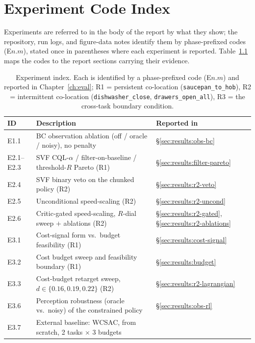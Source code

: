 \documentclass[11pt,a4paper]{report}
\begin{document}
\chapter{Experiment Code Index}
\label{app:exp-index}
\label{sec:setup:exp-index}

Experiments are referred to in the body of the report by what they
show; the repository, run logs, and figure-data notes identify them
by phase-prefixed codes (E$n.m$), stated once in parentheses where
each experiment is reported. Table~\ref{tab:experiment-index} maps
the codes to the report sections carrying their evidence.

\begin{table}[htbp]
\centering
\caption{Experiment index. Each is identified by a phase-prefixed
code (E$n.m$) and reported in Chapter~\ref{ch:eval}; R1 = persistent
co-location (\texttt{saucepan\_to\_hob}), R2 = intermittent
co-location (\texttt{dishwasher\_close}, \texttt{drawers\_open\_all}),
R3 = the cross-task boundary condition.}
\label{tab:experiment-index}
\small
\begin{tabular}{lll}
\toprule
ID & Description & Reported in \\
\midrule
E1.1   & BC observation ablation (off / oracle / noisy), no penalty
       & \S\ref{sec:results:obs-bc} \\
E2.1--E2.3 & SVF CQL-$\alpha$ / filter-on-baseline / threshold-$R$ Pareto (R1)
       & \S\ref{sec:results:filter-pareto} \\
E2.4   & SVF binary veto on the chunked policy (R2)
       & \S\ref{sec:results:r2-veto} \\
E2.5   & Unconditional speed-scaling (R2)
       & \S\ref{sec:results:r2-uncond} \\
E2.6   & Critic-gated speed-scaling, $R$-dial sweep $+$ ablations (R2)
       & \S\ref{sec:results:r2-gated}, \S\ref{sec:results:r2-ablations} \\
E3.1   & Cost-signal form vs.\ budget feasibility (R1)
       & \S\ref{sec:results:cost-signal} \\
E3.2   & Cost budget sweep and feasibility boundary (R1)
       & \S\ref{sec:results:budget} \\
E3.3   & Cost-budget retarget sweep, $d \in \{0.16, 0.19, 0.22\}$ (R2)
       & \S\ref{sec:results:r2-lagrangian} \\
E3.6   & Perception robustness (oracle vs.\ noisy) of the constrained policy
       & \S\ref{sec:results:obs-rl} \\
E3.7   & External baseline: WCSAC, from scratch, 2 tasks $\times$ 3 budgets

\end{tabular}
\end{table}
\end{document}
